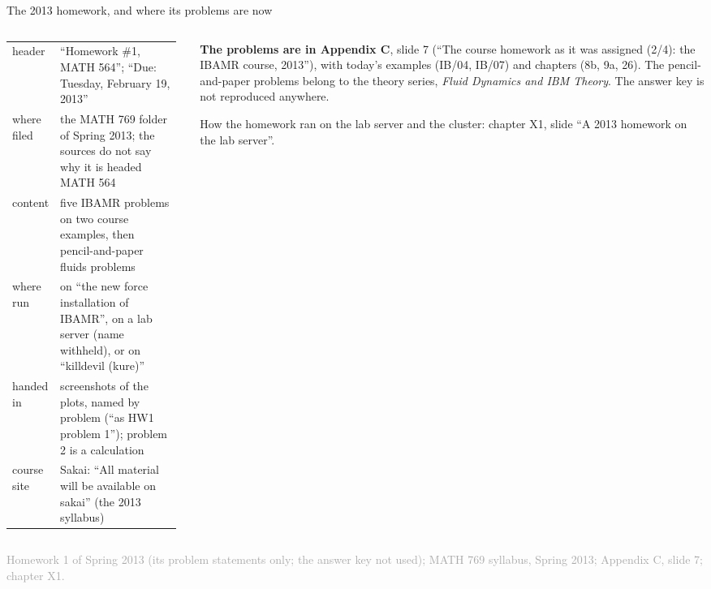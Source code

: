 \documentclass[aspectratio=169,11pt]{beamer}
\newcommand{\sourcecredit}[1]{\vfill\begin{flushright}\tiny\textcolor{DarkGray}{#1}\end{flushright}}
\begin{document}
\begin{frame}{The 2013 homework, and where its problems are now}
\label{fr:hw2013}
\begin{columns}[T,onlytextwidth]
\begin{column}{0.53\textwidth}
\footnotesize
\renewcommand{\arraystretch}{1.25}
\setlength{\tabcolsep}{3pt}
\begin{tabular}{@{}L{0.24\linewidth}L{0.72\linewidth}@{}}
\toprule
header & ``Homework \#1, MATH 564''; ``Due: Tuesday, February 19, 2013'' \\
where filed & the MATH 769 folder of Spring 2013; the sources do not say why it is headed MATH 564 \\
content & five IBAMR problems on two course examples, then pencil-and-paper fluids problems \\
where run & on ``the new force installation of IBAMR'', on a lab server (name withheld), or on ``killdevil (kure)'' \\
handed in & screenshots of the plots, named by problem (``as HW1 problem 1''); problem 2 is a calculation \\
course site & Sakai: ``All material will be available on sakai'' (the 2013 syllabus) \\
\bottomrule
\end{tabular}
\end{column}
\begin{column}{0.44\textwidth}
\begin{homebox}
\footnotesize \textbf{The problems are in Appendix C}, slide 7 (``The course homework as it was assigned (2/4): the IBAMR course, 2013''), with today's examples (IB/04, IB/07) and chapters (8b, 9a, 26). The pencil-and-paper problems belong to the theory series, \emph{Fluid Dynamics and IBM Theory}. The answer key is not reproduced anywhere.
\end{homebox}
\vspace{2mm}
\footnotesize How the homework ran on the lab server and the cluster: chapter X1, slide ``A 2013 homework on the lab server''.
\end{column}
\end{columns}
\sourcecredit{Homework 1 of Spring 2013 (its problem statements only; the answer key not used); MATH 769 syllabus, Spring 2013; Appendix C, slide 7; chapter X1.}
\end{frame}
\end{document}
